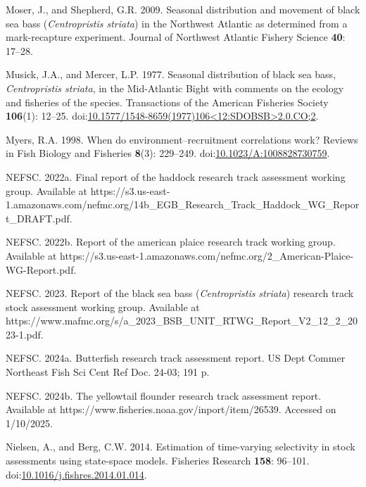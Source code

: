 \documentclass[
]{article}
\newlength{\cslhangindent}
\newlength{\cslentryspacingunit} %
\newenvironment{CSLReferences}[2] %
 {%
  \setlength{\parindent}{0pt}
  \ifodd #1
  \let\oldpar\par
  \def\par{\hangindent=\cslhangindent\oldpar}
  \fi
  \setlength{\parskip}{#2\cslentryspacingunit}
 }%
 {}
\begin{document}
\begin{CSLReferences}{1}{0}
\leavevmode{}%
Moser, J., and Shepherd, G.R. 2009. Seasonal distribution and movement of black sea bass (\emph{{C}entropristis striata}) in the {N}orthwest {A}tlantic as determined from a mark-recapture experiment. Journal of Northwest Atlantic Fishery Science \textbf{40}: 17--28.

\leavevmode{}%
Musick, J.A., and Mercer, L.P. 1977. Seasonal distribution of black sea bass, \emph{{C}entropristis striata}, in the {M}id-{A}tlantic {B}ight with comments on the ecology and fisheries of the species. Transactions of the American Fisheries Society \textbf{106}(1): 12--25. doi:\href{https://doi.org/10.1577/1548-8659(1977)106\%3C12:SDOBSB\%3E2.0.CO;2}{10.1577/1548-8659(1977)106\textless12:SDOBSB\textgreater2.0.CO;2}.

\leavevmode{}%
Myers, R.A. 1998. When do environment--recruitment correlations work? Reviews in Fish Biology and Fisheries \textbf{8}(3): 229--249. doi:\href{https://doi.org/10.1023/A:1008828730759}{10.1023/A:1008828730759}.

\leavevmode{}%
NEFSC. 2022a. Final report of the haddock research track assessment working group. {Available} at https://s3.us-east-1.amazonaws.com/nefmc.org/14b\_EGB\_Research\_Track\_Haddock\_WG\_Report\_DRAFT.pdf.

\leavevmode{}%
NEFSC. 2022b. Report of the american plaice research track working group. {Available} at https://s3.us-east-1.amazonaws.com/nefmc.org/2\_American-Plaice-WG-Report.pdf.

\leavevmode{}%
NEFSC. 2023. Report of the black sea bass (\emph{{C}entropristis} \emph{striata}) research track stock assessment working group. {Available} at https://www.mafmc.org/s/a\_2023\_BSB\_UNIT\_RTWG\_Report\_V2\_12\_2\_2023-1.pdf.

\leavevmode{}%
NEFSC. 2024a. Butterfish research track assessment report. US Dept Commer Northeast Fish Sci Cent Ref Doc. 24-03; 191 p.

\leavevmode{}%
NEFSC. 2024b. The yellowtail flounder research track assessment report. {Available} at https://www.fisheries.noaa.gov/inport/item/26539. Accessed on 1/10/2025.

\leavevmode{}%
Nielsen, A., and Berg, C.W. 2014. Estimation of time-varying selectivity in stock assessments using state-space models. Fisheries Research \textbf{158}: 96--101. doi:\href{https://doi.org/10.1016/j.fishres.2014.01.014}{10.1016/j.fishres.2014.01.014}.


\end{CSLReferences}
\end{document}
